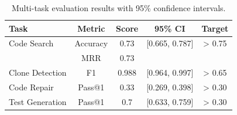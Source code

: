 \begin{table}[t]
\centering
\begin{tabular}{lcccc}
\hline
Task & Metric & Score & 95\% CI & Target \\
\hline
Code Search & Accuracy & 0.73 & [0.665, 0.787] & > 0.75 \\
& MRR & 0.73 & & \\
Clone Detection & F1 & 0.988 & [0.964, 0.997] & > 0.65 \\
Code Repair & Pass@1 & 0.33 & [0.269, 0.398] & > 0.30 \\
Test Generation & Pass@1 & 0.7 & [0.633, 0.759] & > 0.30 \\
\hline\end{tabular}
\caption{Multi-task evaluation results with 95\% confidence intervals.}
\end{table}
